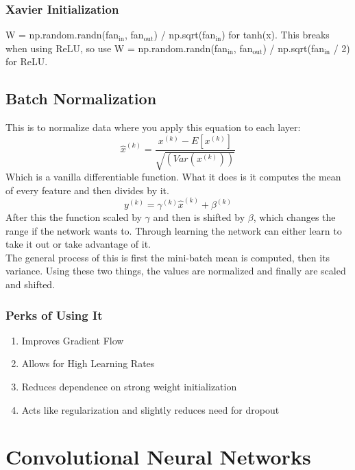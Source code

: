 \documentclass[11pt]{article}
\begin{document}
\subsubsection{Xavier Initialization}
\label{sec-1-3-1}
W = np.random.randn(fan$_{\text{in}}$, fan$_{\text{out}}$) / np.sqrt(fan$_{\text{in}}$) for tanh(x). This breaks when using ReLU, so use
W = np.random.randn(fan$_{\text{in}}$, fan$_{\text{out}}$) / np.sqrt(fan$_{\text{in}}$ / 2) for ReLU.
\subsection{Batch Normalization}
\label{sec-1-4}
This is to normalize data where you apply this equation to each layer:
$$\hat{x}^{(k)} = \frac{x^{(k)} - E[x^{(k)}]}{\sqrt{(Var(x^{(k)}))}}$$ 
Which is a vanilla differentiable function. What it does is it computes the mean of every feature and then divides by it.
$$ y^{(k)} = \gamma^{(k)} \hat{x}^{(k)} + \beta^{(k)}$$
After this the function scaled by $\gamma$ and then is shifted by $\beta$, which changes the range if the network wants to. Through learning the network can either learn
to take it out or take advantage of it. \\
The general process of this is first the  mini-batch mean is computed, then its variance. 
Using these two things, the values are normalized and finally are scaled and shifted.
\subsubsection{Perks of Using It}
\label{sec-1-4-1}
\begin{enumerate}
\item Improves Gradient Flow
\label{sec-1-4-1-1}
\item Allows for High Learning Rates
\label{sec-1-4-1-2}
\item Reduces dependence on strong weight initialization
\label{sec-1-4-1-3}
\item Acts like regularization and slightly reduces need for dropout
\label{sec-1-4-1-4}
\end{enumerate}
\section{Convolutional Neural Networks}
\label{sec-2}
\end{document}
